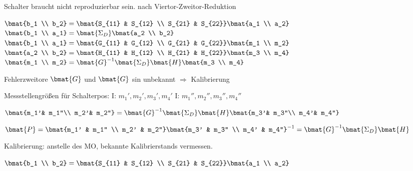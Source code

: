 
Schalter braucht nicht reproduzierbar sein.
nach Viertor-Zweitor-Reduktion



$\bmat{b_1 \\ b_2} = \bmat{S_{11} & S_{12} \\ S_{21} & S_{22}} \bmat{a_1 \\ a_2}$ \\
$\bmat{b_1 \\ a_1} = \bmat{\Sigma_D} \bmat{a_2 \\ b_2}$ \\
$\bmat{b_1 \\ a_1} = \bmat{G_{11} & G_{12} \\ G_{21} & G_{22}} \bmat{m_1 \\ m_2}$ \\
$\bmat{a_2 \\ b_2} = \bmat{H_{11} & H_{12} \\ H_{21} & H_{22}} \bmat{m_3 \\ m_4}$ \\

$\bmat{m_1 \\ m_2} = \bmat{G}^{-1} \bmat{\Sigma_D} \bmat{H} \bmat{m_3 \\ m_4}$


\begin{pitemize}
    \item Fehlerzweitore $\bmat{G}$ und $\bmat{G}$ sin unbekannt $\Rightarrow$ Kalibrierung
    \item Messstellengrößen für Schalterpos:
    \subitem I: $m_1', m_2', m_3', m_4'$
    \subitem I: $m_1'', m_2'', m_3'', m_4''$
\end{pitemize}

$\bmat{m_1'& m_1''\\ m_2'& m_2''} = \bmat{G}^{-1} \bmat{\Sigma_D} \bmat{H} \bmat{m_3'& m_3''\\ m_4'& m_4''}$

$\bmat{P} = \bmat{m_1' & m_1'' \\ m_2' & m_2''}\bmat{m_3' & m_3'' \\ m_4' & m_4''}^{-1} =  \bmat{G}^{-1} \bmat{\Sigma_D} \bmat{H}$

Kalibrierung: anstelle des MO, bekannte Kalibrierstands vermessen.

$\bmat{b_1 \\ b_2} = \bmat{S_{11} & S_{12} \\ S_{21} & S_{22}} \bmat{a_1 \\ a_2}$

